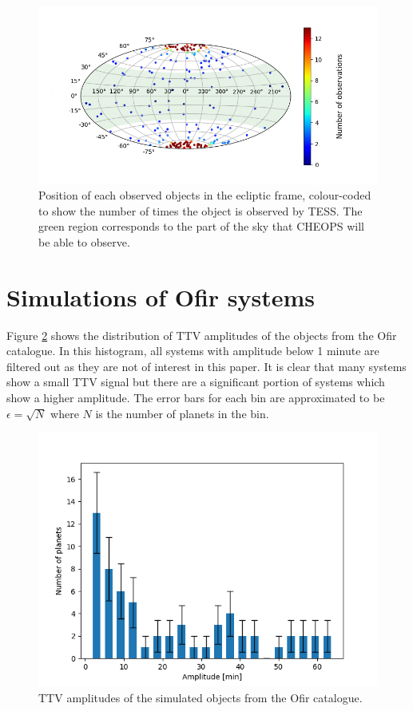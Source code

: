\documentclass[12pt]{report}
\begin{document}
\begin{figure}[h!]
	\centering
	\includegraphics[width=\textwidth]{img/skymap_TESS_multi.png}
	  \caption{Position of each observed objects in the ecliptic frame, colour-coded to show the number of times the object is observed by TESS. The green region corresponds to the part of the sky that CHEOPS will be able to observe.}	
	  \label{fig:skymap_TESS}	
\end{figure}\newpage
\section{Simulations of Ofir systems}
	Figure \ref{fig:ampl_ofir} shows the distribution of TTV amplitudes of the objects from the Ofir catalogue. In this histogram, all systems with amplitude below 1 minute are filtered out as they are not of interest in this paper. It is clear that many systems show a small TTV signal but there are a significant portion of systems which show a higher amplitude. The error bars for each bin are approximated to be $\epsilon = \sqrt{N}$ where $N$ is the number of planets in the bin.
\begin{figure}
 	 \centering
	  \includegraphics[width=\textwidth]{img/ampl_ofir_66.png}
	  \caption{TTV amplitudes of the simulated objects from the Ofir catalogue.}
	 \label{fig:ampl_ofir}
\end{figure}  
\end{document}
